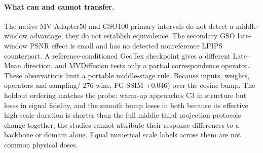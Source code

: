 \documentclass[times,twocolumn,final]{elsarticle}
\providecommand{\DIFadd}[1]{{\protect\color{blue} \sf #1}} %
\providecommand{\DIFdel}[1]{{\protect\color{red} \scriptsize #1}} %
\providecommand{\DIFaddbegin}{} %
\providecommand{\DIFaddend}{} %
\providecommand{\DIFdelbegin}{} %
\providecommand{\DIFdelend}{} %
\begin{document}
\paragraph{What can and cannot transfer.}
\DIFadd{The native MV-Adapter50 and GSO100 primary intervals do not detect a middle-window advantage; they do not establish equivalence. The secondary GSO late-window PSNR effect is small and has no detected nonreference LPIPS counterpart. A reference-conditioned GeoTex checkpoint gives a different Late--Mean direction, and MVDiffusion tests only a partial correspondence operator. These observations limit a portable middle-stage rule. Because inputs, weights, operators and sampling}\DIFaddend /\DIFdelbegin \DIFdel{276 wins, FG-SSIM $+0.046$) over the cosine bump. The holdout ordering matches the probe: warm-up approaches C3 in structure but loses in signal fidelity, and the smooth bump loses in both because its effective high-scale duration is shorter than the full middle third}\DIFdelend \DIFaddbegin \DIFadd{projection protocols change together, the studies cannot attribute their response differences to a backbone or domain alone. Equal numerical scale labels across them are not common physical doses}\DIFaddend .

\DIFdelbegin %
\end{document}
